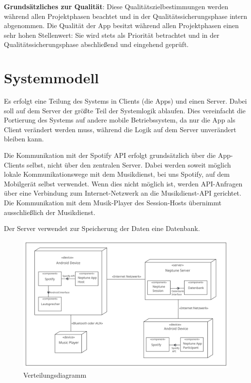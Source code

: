 \documentclass[oneside, ngerman]{sdqtechreport}
\begin{document}
\textbf{Grundsätzliches zur Qualität}: Diese Qualitätszielbestimmungen werden während allen Projektphasen beachtet und in der Qualitätssicherungsphase intern abgenommen. Die Qualität der App besitzt während allen Projektphasen einen sehr hohen Stellenwert: Sie wird stets als Priorität betrachtet und in der Qualitätssicherungsphase abschließend und eingehend geprüft.


\chapter{Systemmodell}
\label{chap:Systemmodell}

Es erfolgt eine Teilung des Systems in Clients (die Apps) und einen Server. Dabei soll auf dem Server der größte Teil der Systemlogik ablaufen. Dies vereinfacht die Portierung des Systems auf andere mobile Betriebssystem, da nur die App als Client verändert werden muss, während die Logik auf dem Server unverändert bleiben kann.

Die Kommunikation mit der Spotify API erfolgt grundsätzlich über die App-Clients selbst, nicht über den zentralen Server. Dabei werden soweit möglich lokale Kommunikationswege mit dem Musikdienst, bei uns Spotify, auf dem Mobilgerät selbst verwendet. Wenn dies nicht möglich ist, werden API-Anfragen über eine Verbindung zum Internet-Netzwerk an die Musikdienst-API gerichtet. Die Kommunikation mit dem Musik-Player des Session-Hosts übernimmt ausschließlich der Musikdienst.

Der Server verwendet zur Speicherung der Daten eine Datenbank.

\vspace{1cm}

\begin{figure}[h]
    \includegraphics[width = 16cm]{LATEX/Pflichtenheft/GraphicDesigns/Verteilungsdiagramm.png}
    \caption{Verteilungsdiagramm}
    \label{fig:Verteilungsdiagramm}
\end{figure}
\end{document}

